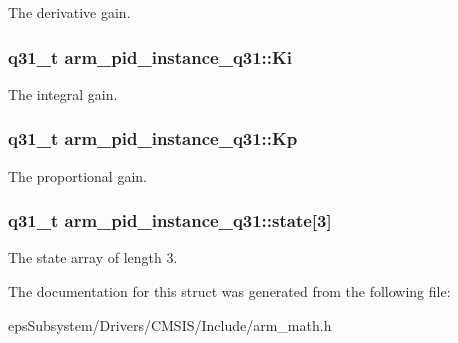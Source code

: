 The derivative gain. \hypertarget{structarm__pid__instance__q31_aa861d69fd398f29aa0b4b455a823ed72}{
\subsubsection[{Ki}]{\setlength{\rightskip}{0pt plus 5cm}q31\-\_\-t arm\-\_\-pid\-\_\-instance\-\_\-q31\-::\-Ki}}\label{structarm__pid__instance__q31_aa861d69fd398f29aa0b4b455a823ed72}
The integral gain. \hypertarget{structarm__pid__instance__q31_ac2410bf7f856d58dc1d773d4983cac8e}{
\subsubsection[{Kp}]{\setlength{\rightskip}{0pt plus 5cm}q31\-\_\-t arm\-\_\-pid\-\_\-instance\-\_\-q31\-::\-Kp}}\label{structarm__pid__instance__q31_ac2410bf7f856d58dc1d773d4983cac8e}
The proportional gain. \hypertarget{structarm__pid__instance__q31_a228e4a64da6014844a0a671a1fa391d4}{
\subsubsection[{state}]{\setlength{\rightskip}{0pt plus 5cm}q31\-\_\-t arm\-\_\-pid\-\_\-instance\-\_\-q31\-::state\mbox{[}3\mbox{]}}}\label{structarm__pid__instance__q31_a228e4a64da6014844a0a671a1fa391d4}
The state array of length 3. 

The documentation for this struct was generated from the following file\-:\begin{DoxyCompactItemize}
\item 
eps\-Subsystem/\-Drivers/\-C\-M\-S\-I\-S/\-Include/arm\-\_\-math.\-h\end{DoxyCompactItemize}

